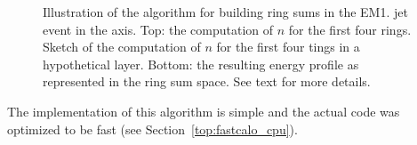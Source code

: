 \begin{figure}[!ht]
\begin{center}
  \caption{\label{fig:building_rings}
  Illustration of the \fastcalo algorithm for building ring sums in the EM1.
  jet event in the \etaphi axis.  
  Top: the computation of $n$ for the first four rings.%
  Sketch of the computation of $n$ for the first four tings in a
  hypothetical layer. Bottom: the resulting energy profile as represented in the ring sum space. 
  See text for more details.}
  \end{center}
  \end{figure}











The implementation of this algorithm is simple and the actual code
was optimized to be fast (see Section~\ref{top:fastcalo_cpu}). %


